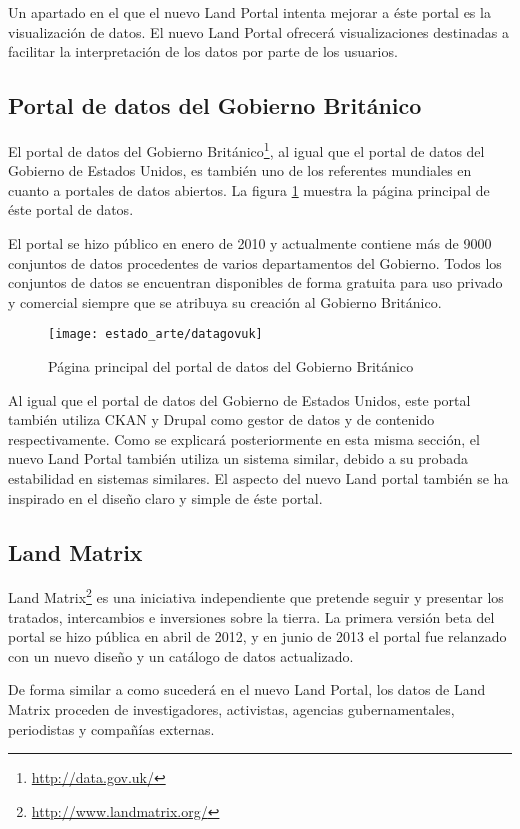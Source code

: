 {Un apartado en el que el nuevo Land Portal intenta mejorar a éste portal es la visualización de datos. El nuevo Land Portal ofrecerá visualizaciones destinadas a facilitar la interpretación de los datos por parte de los usuarios.

\subsection{Portal de datos del Gobierno Británico}
El portal de datos del Gobierno Británico\footnote{\url{http://data.gov.uk/}}, al igual que el portal de datos del Gobierno de Estados Unidos, es también uno de los referentes mundiales en cuanto a portales de datos abiertos.  La figura \ref{fig:estado_arte_datagovuk} muestra la página principal de éste portal de datos.

El portal se hizo público en enero de 2010 y actualmente contiene más de 9000 conjuntos de datos procedentes de varios departamentos del Gobierno.  Todos los conjuntos de datos se encuentran disponibles de forma gratuita para uso privado y comercial siempre que se atribuya su creación al Gobierno Británico.
\begin{figure}[h]
\centering
\texttt{[image: estado\_arte/datagovuk]}
\caption{Página principal del portal de datos del Gobierno Británico}
\label{fig:estado_arte_datagovuk}
\end{figure}

Al igual que el portal de datos del Gobierno de Estados Unidos, este portal también utiliza CKAN y Drupal como gestor de datos y de contenido respectivamente.  Como se explicará posteriormente en esta misma sección, el nuevo Land Portal también utiliza un sistema similar, debido a su probada estabilidad en sistemas similares.  El aspecto del nuevo Land portal también se ha inspirado en el diseño claro y simple de éste portal.


\subsection{Land Matrix}
	Land Matrix\footnote{\url{http://www.landmatrix.org/}} es una iniciativa independiente que pretende seguir y presentar los tratados, intercambios e inversiones sobre la tierra.  La primera versión beta del portal se hizo pública en abril de 2012, y en junio de 2013 el portal fue relanzado con un nuevo diseño y un catálogo de datos actualizado.
	
	De forma similar a como sucederá en el nuevo Land Portal, los datos de Land Matrix proceden de investigadores, activistas, agencias gubernamentales, periodistas y compañías externas.
	
}
